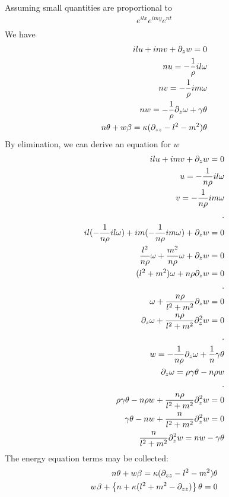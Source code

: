 \documentclass[11pt]{article}
\begin{document}
Assuming small quantities are proportional to
\begin{equation}\begin{aligned}
e^{ilx} e^{imy} e^{nt} \\
\end{aligned} \end{equation}
We have
\begin{equation}\begin{aligned}
il u + im v + \partial_z w = 0 \\
n u = -\frac{1}{\rho} il \omega \\
n v = -\frac{1}{\rho} im \omega \\
n w = -\frac{1}{\rho} \partial_z \omega + \gamma \theta \\
n \theta + w \beta = \kappa (\partial_{zz}-l^2 -m^2) \theta \\
\end{aligned} \end{equation}
By elimination, we can derive an equation for $w$
\begin{equation}\begin{aligned}
il u + im v + \PD_z w = 0 \\
u = -\frac{1}{n \rho} il \omega \\
v = -\frac{1}{n \rho} im \omega \\
. \\
il (-\frac{1}{n \rho} il \omega) + im (-\frac{1}{n \rho} im \omega) + \PD_z w = 0 \\
\frac{l^2}{n \rho} \omega + \frac{m^2}{n \rho} \omega + \PD_z w = 0 \\
(l^2 + m^2)\omega + n \rho \PD_z w = 0 \\
. \\
\omega + \frac{n \rho}{l^2 + m^2} \PD_z w = 0 \\
\PD_z \omega + \frac{n \rho}{l^2 + m^2} \PD_z^2 w = 0 \\
%
. \\
w = -\frac{1}{n \rho} \PD_z \omega + \frac{1}{n}\gamma \theta \\
\PD_z \omega = \rho \gamma \theta - n \rho w \\
. \\
\rho \gamma \theta - n \rho w + \frac{n \rho}{l^2 + m^2} \PD_z^2 w = 0 \\
\gamma \theta - n w + \frac{n}{l^2 + m^2} \PD_z^2 w = 0 \\
\frac{n}{l^2 + m^2} \PD_z^2 w = n w - \gamma \theta \\
\end{aligned} \end{equation}
The energy equation terms may be collected:
\begin{equation}\begin{aligned}
n \theta + w \beta = \kappa (\partial_{zz}-l^2 -m^2) \theta \\
w \beta + \left\{n + \kappa (l^2 +m^2-\partial_{zz}) \right\} \theta = 0 \\
\end{aligned} \end{equation}
\end{document}
